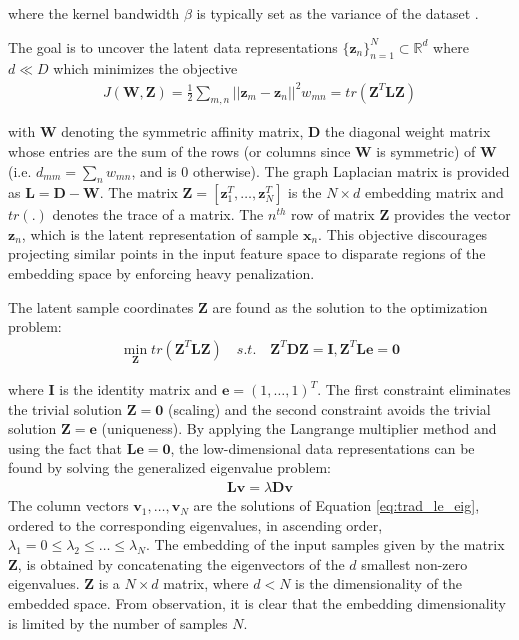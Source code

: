 \noindent
where the kernel bandwidth $\beta$ is typically set as the variance of the dataset \citep{Raducanu2012SupervisedNonlinearDimReduction,Thorstensen2009ManifoldThesis}.

The goal is to uncover the latent data representations $\{ \bm{z}_n \}^{N}_{n=1} \subset \mathbb{R}^{d}$ where $d \ll D$ which minimizes the objective 
\begin{align}
	J(\bm{W},\bm{Z}) = \frac{1}{2} \sum_{m,n}^{}||\bm{z}_{m} - \bm{z}_{n} ||^{2}w_{mn} = tr(\bm{Z}^{T}\bm{L}\bm{Z})
\end{align}

\noindent
with $\bm{W}$ denoting the symmetric affinity matrix, $\bm{D}$ the diagonal weight matrix whose entries are the sum of the rows (or columns since $\bm{W}$ is symmetric) of $\bm{W}$ (i.e. $d_{mm} = \sum_{n}w_{mn}$, and is $0$ otherwise).  The graph Laplacian matrix is provided as $\bm{L} = \bm{D} - \bm{W}$.  The matrix $\bm{Z} = [\bm{z}^{T}_{1}, \dots, \bm{z}^{T}_{N}]$ is the $N \times d$ embedding matrix and $tr(.)$ denotes the trace of a matrix. The $n^{th}$ row of matrix $\bm{Z}$ provides the vector $\bm{z}_n$, which is the latent representation of sample  $\bm{x}_n$. This objective discourages projecting similar points in the input feature space to disparate regions of the embedding space by enforcing heavy penalization. 

The latent sample coordinates $\bm{Z}$ are found as the solution to the optimization problem:
\begin{align}
	\min_{\bm{Z}} tr(\bm{Z}^{T}\bm{L}\bm{Z}) \quad s.t. \quad \bm{Z}^{T}\bm{D}\bm{Z} = \bm{I}, \bm{Z}^{T}\bm{L}\bm{e} = \bm{0}
\end{align}

\noindent
where $\bm{I}$ is the identity matrix and $\bm{e} = (1, \dots, 1)^{T}$.  The first constraint eliminates the trivial solution $\bm{Z} = \bm{0}$ (scaling) and the second constraint avoids the trivial solution $\bm{Z} = \bm{e}$ (uniqueness). By applying the Langrange multiplier method and using the fact that $\bm{L}\bm{e} = \bm{0}$, the low-dimensional data representations can be found by solving the generalized eigenvalue problem:
\begin{align}
	\bm{L}\bm{v} = \lambda \bm{D} \bm{v} \label{eq:trad_le_eig}
\end{align}
\noindent
The column vectors $\bm{v}_{1}, \dots, \bm{v}_{N}$ are the solutions of Equation \ref{eq:trad_le_eig}, ordered to the corresponding eigenvalues, in ascending order, $\lambda_{1} = 0 \leq \lambda_{2} \leq \dots \leq \lambda_{N} $. The embedding of the input samples given by the matrix $\bm{Z}$, is obtained by concatenating the eigenvectors of the $d$ smallest non-zero eigenvalues.  $\bm{Z}$ is a $N \times d$ matrix, where $d < N$ is the dimensionality of the embedded space.  From observation, it is clear that the embedding dimensionality is limited by the number of samples $N$.

